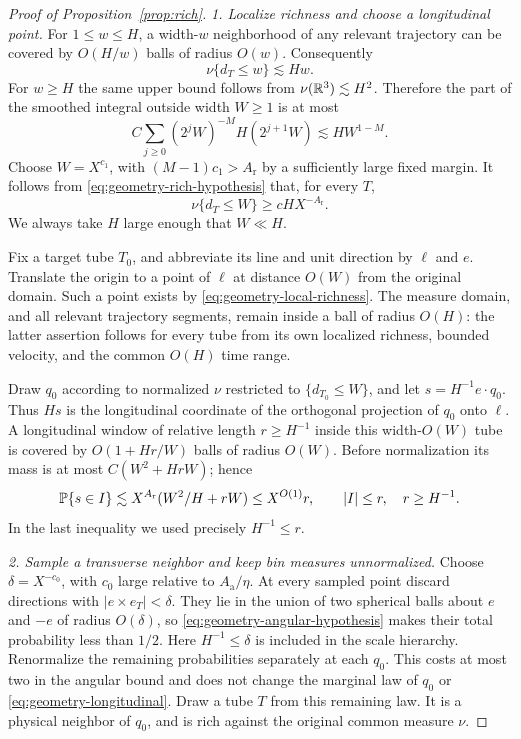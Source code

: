 \begin{proof}[Proof of Proposition~\ref{prop:rich}]
\emph{1. Localize richness and choose a longitudinal point.}
For $1\leq w\leq H$, a width-$w$ neighborhood of any relevant
trajectory can be covered by $O(H/w)$ balls of radius $O(w)$.
Consequently
\begin{equation}\label{eq:geometry-tube-cover}
 \nu\{d_T\leq w\}\lesssim Hw.
\end{equation}
For $w\geq H$ the same upper bound follows from
$\nu(\mathbb R^3)\lesssim H^2$. Therefore the part of the smoothed
integral outside width $W\geq1$ is at most
\[
 C\sum_{j\geq0}(2^jW)^{-M}H(2^{j+1}W)
 \lesssim HW^{1-M}.
\]
Choose $W=X^{c_1}$, with $(M-1)c_1>A_{\mathrm r}$ by a sufficiently
large fixed margin. It follows from
\eqref{eq:geometry-rich-hypothesis} that, for every $T$,
\begin{equation}\label{eq:geometry-local-richness}
 \nu\{d_T\leq W\}\geq cH X^{-A_{\mathrm r}}.
\end{equation}
We always take $H$ large enough that $W\ll H$.

Fix a target tube $T_0$, and abbreviate its line and unit direction
by $\ell$ and $e$. Translate the origin to a point of $\ell$ at
distance $O(W)$ from the original domain. Such a point exists by
\eqref{eq:geometry-local-richness}. The measure domain, and all
relevant trajectory segments, remain inside a ball of radius $O(H)$:
the latter assertion follows for every tube from its own localized
richness, bounded velocity, and the common $O(H)$ time range.

Draw $q_0$ according to normalized $\nu$ restricted to
$\{d_{T_0}\leq W\}$, and let
$s=H^{-1}e\cdot q_0$. Thus $Hs$ is the longitudinal coordinate of
the orthogonal projection of $q_0$ onto $\ell$. A longitudinal window
of relative length $r\geq H^{-1}$ inside this width-$O(W)$ tube
is covered by $O(1+Hr/W)$ balls of radius $O(W)$. Before normalization
its mass is at most $C(W^2+HrW)$; hence
\begin{equation}\label{eq:geometry-longitudinal}
 \mathbb P\{s\in I\}\lesssim
 X^{A_{\mathrm r}}(W^2/H+rW)
 \leq X^{O(1)}r,
 \qquad |I|\leq r,\quad r\geq H^{-1}.
\end{equation}
In the last inequality we used precisely $H^{-1}\leq r$.

\emph{2. Sample a transverse neighbor and keep bin measures
unnormalized.}
Choose $\delta=X^{-c_0}$, with $c_0$ large relative to
$A_{\mathrm a}/\eta$. At every sampled point discard directions
with $|e\times e_T|<\delta$. They lie in the union of two spherical
balls about $e$ and $-e$ of radius $O(\delta)$, so
\eqref{eq:geometry-angular-hypothesis} makes their total probability
less than $1/2$. Here $H^{-1}\leq\delta$ is included in the scale
hierarchy. Renormalize the remaining probabilities separately at
each $q_0$. This costs at most two in the angular bound and does not
change the marginal law of $q_0$ or \eqref{eq:geometry-longitudinal}.
Draw a tube $T$ from this remaining law. It is a physical neighbor
of $q_0$, and is rich against the original common measure $\nu$.


\end{proof}
